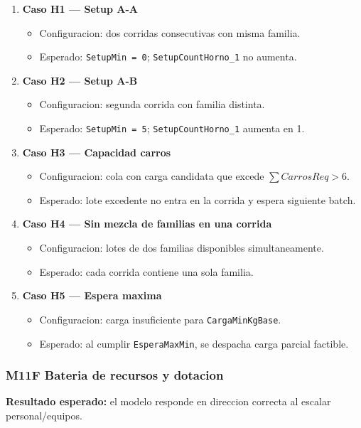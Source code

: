 \documentclass[11pt]{article}
\newcommand{\state}[1]{\texttt{#1}}
\begin{document}
\begin{enumerate}
  \item \textbf{Caso H1 --- Setup A-A}
  \begin{itemize}
    \item Configuracion: dos corridas consecutivas con misma familia.
    \item Esperado: \state{SetupMin = 0}; \state{SetupCountHorno\_1} no aumenta.
  \end{itemize}
  \item \textbf{Caso H2 --- Setup A-B}
  \begin{itemize}
    \item Configuracion: segunda corrida con familia distinta.
    \item Esperado: \state{SetupMin = 5}; \state{SetupCountHorno\_1} aumenta en 1.
  \end{itemize}
  \item \textbf{Caso H3 --- Capacidad carros}
  \begin{itemize}
    \item Configuracion: cola con carga candidata que excede \(\sum CarrosReq > 6\).
    \item Esperado: lote excedente no entra en la corrida y espera siguiente batch.
  \end{itemize}
  \item \textbf{Caso H4 --- Sin mezcla de familias en una corrida}
  \begin{itemize}
    \item Configuracion: lotes de dos familias disponibles simultaneamente.
    \item Esperado: cada corrida contiene una sola familia.
  \end{itemize}
  \item \textbf{Caso H5 --- Espera maxima}
  \begin{itemize}
    \item Configuracion: carga insuficiente para \state{CargaMinKgBase}.
    \item Esperado: al cumplir \state{EsperaMaxMin}, se despacha carga parcial factible.
  \end{itemize}
\end{enumerate}

\subsubsection{M11F Bateria de recursos y dotacion}
\textbf{Resultado esperado:} el modelo responde en direccion correcta al escalar personal/equipos.
\end{document}
